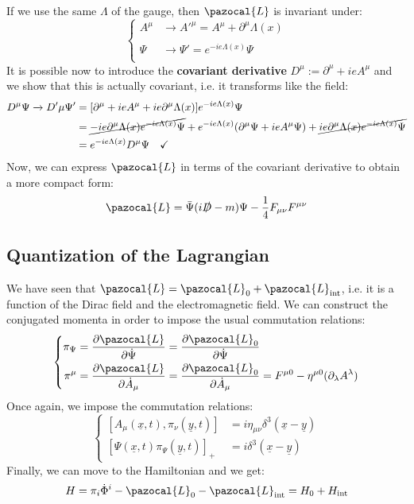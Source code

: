 \documentclass[../main.tex]{subfiles}
\begin{document}
If we use the same $\Lambda$ of the gauge, then $\pazocal{L}$ is invariant under:
\[
\left\{
\begin{aligned}
A^\mu&\xrightarrow[]{}A'^\mu=A^\mu+\partial^\mu\Lambda(x)\\
\Psi&\xrightarrow[]{}\Psi'=e^{-ie\Lambda(x)}\Psi
\end{aligned}
\right.
\]
It is possible now to introduce the \textbf{covariant derivative} $D^\mu:=\partial^\mu+ieA^\mu$ and we show that this is actually covariant, i.e. it transforms like the field:
\begin{align*}
D^\mu\Psi\xrightarrow[]{}D'\mu\Psi'&=[\partial^\mu+ieA^\mu+ie\partial^\mu\Lambda(x)]e^{-ie\Lambda(x)}\Psi\\
&=\cancel{-ie\partial^\mu\Lambda(x)e^{-ie\Lambda(x)}\Psi}+e^{-ie\Lambda(x)}(\partial^\mu\Psi+ieA^\mu\Psi)+\cancel{ie\partial^\mu\Lambda(x)e^{-ie\Lambda(x)}\Psi}\\
&=e^{-ie\Lambda(x)}D^\mu\Psi \quad \checkmark
\end{align*}
Now, we can express $\pazocal{L}$ in terms of the covariant derivative to obtain a more compact form:
\[
\pazocal{L}=\bar{\Psi}(i\slashed{D}-m)\Psi-\frac{1}{4}F_{\mu\nu}F^{\mu\nu}
\]
\subsection{Quantization of the Lagrangian}
We have seen that $\pazocal{L}=\pazocal{L}_0+\pazocal{L}_{\text{int}}$, i.e. it is a function of the Dirac field and the electromagnetic field. We can construct the conjugated momenta in order to impose the usual commutation relations:
\[
\left\{
\begin{aligned}
\pi_\Psi&=\frac{\partial\pazocal{L}}{\partial\Dot{\Psi}}=\frac{\partial\pazocal{L}_0}{\partial\Dot{\Psi}}\\
\pi^\mu&=\frac{\partial\pazocal{L}}{\partial\Dot{A}_\mu}=\frac{\partial\pazocal{L}_0}{\partial\Dot{A}_\mu}=F^{\mu0}-\eta^{\mu0}(\partial_\lambda A^\lambda)
\end{aligned}
\right.
\]
Once again, we impose the commutation relations:
\[
\left\{
\begin{aligned}
[A_\mu(\underline{x},t),\pi_\nu(\underline{y},t)]&=i\eta_{\mu\nu}\delta^3(\underline{x}-\underline{y})\\
[\Psi(\underline{x},t)\pi_\Psi(\underline{y},t)]_+&=i\delta^3(\underline{x}-\underline{y})
\end{aligned}
\right.
\]
Finally, we can move to the Hamiltonian and we get:
\[
H=\pi_i\Dot{\Phi}^i-\pazocal{L}_0-\pazocal{L}_{\text{int}}=H_0+H_{\text{int}}
\]
\end{document}
